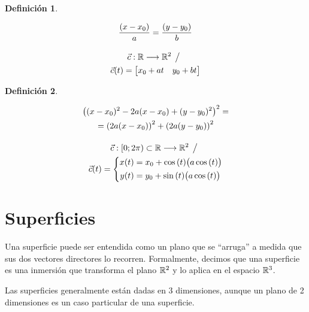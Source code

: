 \documentclass[a5paper,12pt,twoside]{book}
\newtheorem{defn}{{Definición}}[chapter]
\begin{document}

\begin{mdframed}[style=DefinitionFrame]
    \begin{defn}
    \end{defn}
    \begin{gather*}
        \dfrac{(x-x_0)}{a}=\dfrac{(y-y_0)}{b}
        \\[1em]
        \Vec{c}: \mathbb{R} \longrightarrow \mathbb{R}^2 \hspace{1ex} \big/ \hspace{1ex}
        \\
        \Vec{c}(t) = \begin{bmatrix} x_0 + at & y_0 + bt \end{bmatrix}
    \end{gather*}
\end{mdframed}


\begin{mdframed}[style=DefinitionFrame]
    \begin{defn}
    \end{defn}
    \begin{gather*}
        \left( (x-x_0)^2 - 2a(x-x_0) + (y-y_0)^2 \right)^2 = \\
        = \left( 2a(x-x_0) \right)^2 + \left( 2a(y-y_0) \right)^2
        \\[1em]
        \Vec{c}:[0;2 \pi) \subset \mathbb{R} \longrightarrow \mathbb{R}^2 \hspace{1ex} \big/ \hspace{1ex}
        \\
        \Vec{c}(t) = \left\{
        \begin{aligned}
            x(t) &= x_0 + \cos{(t)} \big( a\cos{(t)} \big) \\
            y(t) &= y_0 + \sin{(t)} \big( a\cos{(t)} \big)
        \end{aligned}
        \right.
    \end{gather*}
\end{mdframed}


\section{Superficies}

Una superficie puede ser entendida como un plano que se ``arruga'' a medida que sus dos vectores directores lo recorren.
Formalmente, decimos que una superficie es una inmersión que transforma el plano $\mathbb{R}^2$ y lo aplica en el espacio $\mathbb{R}^3$.

Las superficies generalmente están dadas en 3 dimensiones, aunque un plano de 2 dimensiones es un caso particular de una superficie.
\end{document}
